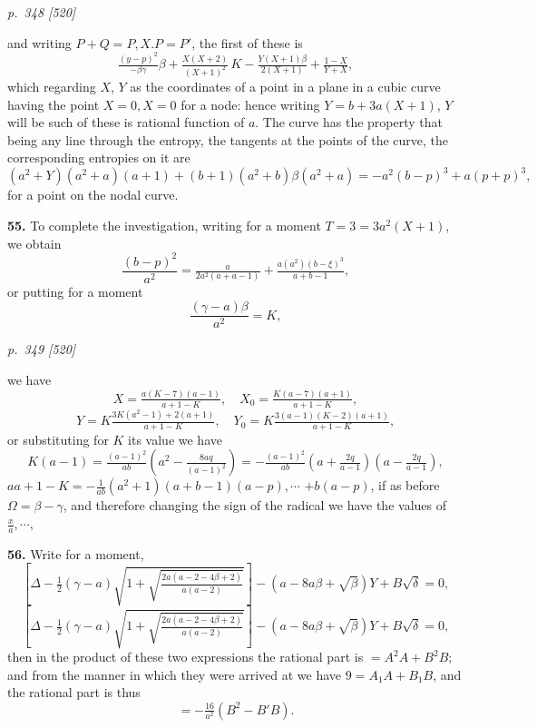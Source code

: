 \documentclass[11pt,a4paper]{article}
\theoremstyle{plain}
\theoremstyle{definition}
\begin{document}
\clearpage

\bigskip
\textit{p.~348 [520]}
\smallskip

and writing $P + Q = P, X. P = P'$, the first of these is
\[
\tfrac{(y - p)^2}{-\beta\gamma}\beta + \tfrac{X(X + 2)}{(X + 1)^2}\,K - \tfrac{Y(X + 1)\beta}{2(X + 1)} + \tfrac{1 - X}{Y + X},
\]
which regarding $X$, $Y$ as the coordinates of a point in a plane in a cubic curve having the point $X = 0, X = 0$ for a node: hence writing $Y = b + 3a(X + 1)$, $Y$ will be such of these is rational function of $a$. The curve has the property that being any line through the entropy, the tangents at the points of the curve, the corresponding entropies on it are
\[
(a^2 + Y)(a^2 + a)(a + 1) + (b + 1)(a^2 + b)\beta(a^2 + a) = -a^2(b - p)^3 + a(p + p)^3,
\]
for a point on the nodal curve.

\textbf{55.} To complete the investigation, writing for a moment $T = 3 = 3a^2(X + 1)$, we obtain
\[
\frac{(b - p)^2}{a^2} = \tfrac{a}{2a^2(a + a - 1)} + \tfrac{a(a^2)(b - \xi)^3}{a + b - 1},
\]
or putting for a moment
\[
\frac{(\gamma - a)\beta}{a^2} = K,
\]

\clearpage

\bigskip
\textit{p.~349 [520]}
\smallskip

we have
\[
X = \tfrac{a(K - 7)(a - 1)}{a + 1 - K},\quad X_0 = \tfrac{K(a - 7)(a + 1)}{a + 1 - K},
\]
\[
Y = K \tfrac{3K(a^2 - 1) + 2(a + 1)}{a + 1 - K},\quad Y_0 = K \tfrac{3(a - 1)(K - 2)(a + 1)}{a + 1 - K},
\]
or substituting for $K$ its value we have
\[
K(a - 1) = \tfrac{(a - 1)^2}{ab}\!\left(a^2 - \tfrac{8aq}{(a - 1)^2}\right) = -\tfrac{(a - 1)^2}{ab}\!\left(a + \tfrac{2q}{a - 1}\right)\!\left(a - \tfrac{2q}{a - 1}\right),
\]
$a a + 1 - K = -\tfrac{1}{ab}(a^2 + 1)\!\left(a + b - 1\right)(a - p), \cdots$
$+ b\!(a - p)$,
if as before $\Omega = \beta - \gamma$, and therefore changing the sign of the radical we have the values of $\tfrac{x}{a}, \cdots$,

\textbf{56.} Write for a moment,
\[
\left[\Delta - \tfrac{1}{2}(\gamma - a)\sqrt{1 + \sqrt{\tfrac{2a(a - 2 - 4\beta + 2)}{a(a - 2)}}}\right] - (a - 8a\beta + \sqrt{\beta})Y + B\sqrt{\delta} = 0,
\]
\[
\left[\Delta - \tfrac{1}{2}(\gamma - a)\sqrt{1 + \sqrt{\tfrac{2a(a - 2 - 4\beta + 2)}{a(a - 2)}}}\right] - (a - 8a\beta + \sqrt{\beta})Y + B\sqrt{\delta} = 0,
\]
then in the product of these two expressions the rational part is $= A^2A + B^2B$; and from the manner in which they were arrived at we have $9 = A_1A + B_1B$, and the rational part is thus
\[
= -\tfrac{16}{a^2}(B^2 - B'B).
\]
\end{document}
